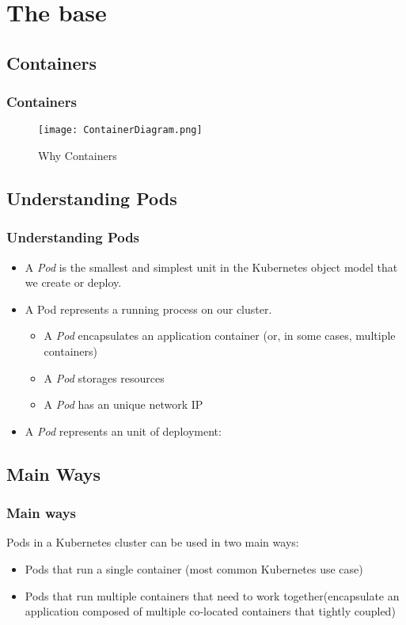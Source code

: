 
\section{The base}

\subsection{Containers}

\begin{frame}[fragile]
  \frametitle{Containers}
\begin{figure}[ht]
  \caption{Why Containers}
  \centering
  \texttt{[image: ContainerDiagram.png]}
  \label{fig:ContainerDiagram}
\end{figure}
\end{frame}

\subsection{Understanding Pods}

\begin{frame}
  \frametitle{Understanding Pods}
  \begin{itemize}
  \item<1->A \emph{Pod} is the smallest and simplest unit in the Kubernetes object model that we create or deploy.
  \item<2->A Pod represents a running process on our cluster.
    \begin{itemize}
    \item<3->A \emph{Pod} encapsulates an application container (or, in some cases, multiple containers)
    \item<4->A \emph{Pod} storages resources
    \item<5->A \emph{Pod} has an unique network IP
    \end{itemize}
  \item<6->A \emph{Pod} represents an unit of deployment:
  \end{itemize}
\end{frame}

\subsection{Main Ways}

\begin{frame}
  \frametitle{Main ways}
  Pods in a Kubernetes cluster can be used in two main ways:
  \begin{itemize}
  \item<2->Pods that run a single container (most common Kubernetes use case)
  \item<3->Pods that run multiple containers that need to work together(encapsulate an application composed of multiple co-located containers that tightly coupled)
  \end{itemize}
\end{frame}

